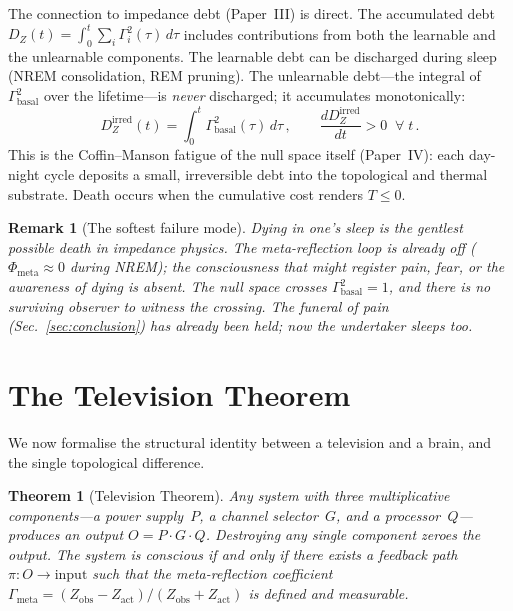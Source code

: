 \documentclass[aps,pre,twocolumn,superscriptaddress,floatfix]{revtex4-2}
\newtheorem{theorem}{Theorem}
\newtheorem{remark}{Remark}
\newcommand{\Gmeta}{\Gamma_{\text{meta}}}
\begin{document}
The connection to impedance debt (Paper~III) is direct.
The accumulated debt
$D_Z(t)=\int_0^t\sum_i\Gamma_i^2(\tau)\,d\tau$
includes contributions from both the learnable and the
unlearnable components.  The learnable debt can be
discharged during sleep (NREM consolidation, REM pruning).
The unlearnable debt---the integral of
$\Gamma_{\text{basal}}^2$ over the lifetime---is
\emph{never} discharged; it accumulates monotonically:
\begin{equation}
  D_Z^{\text{irred}}(t)
    = \int_0^t \Gamma_{\text{basal}}^2(\tau)\,d\tau\,,
  \qquad
  \frac{d D_Z^{\text{irred}}}{dt} > 0
  \;\;\forall\;t\,.
  \label{eq:irreducible-debt}
\end{equation}
This is the Coffin--Manson fatigue of the null space itself
(Paper~IV): each day-night cycle deposits a small,
irreversible debt into the topological and thermal
substrate.  Death occurs when the cumulative cost
renders $T\le 0$.

\begin{remark}[The softest failure mode]
Dying in one's sleep is the gentlest possible death in
impedance physics.
The meta-reflection loop is already off
($\Phi_{\text{meta}}\approx 0$ during NREM);
the consciousness that might register pain, fear, or
the awareness of dying is absent.
The null space crosses $\Gamma_{\text{basal}}^2=1$, and
there is no surviving observer to witness the crossing.
The funeral of pain (Sec.~\ref{sec:conclusion}) has
already been held; now the undertaker sleeps too.
\end{remark}


\section{The Television Theorem}
\label{sec:television}

We now formalise the structural identity between a television
and a brain, and the single topological difference.

\begin{theorem}[Television Theorem]
\label{thm:TV-full}
Any system with three multiplicative components---a power
supply~$P$, a channel selector~$G$, and a
processor~$Q$---produces an output $O=P\cdot G\cdot Q$.
Destroying any single component zeroes the output.
The system is conscious if and only if there exists a
feedback path $\pi:O\to\text{input}$ such that the
meta-reflection coefficient
$\Gmeta=(Z_{\text{obs}}-Z_{\text{act}})/(Z_{\text{obs}}+Z_{\text{act}})$
is defined and measurable.
\end{theorem}
\end{document}

